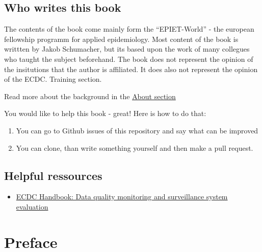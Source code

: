 \documentclass[
  letterpaper,
  DIV=11,
  numbers=noendperiod]{scrreprt}
\providecommand{\tightlist}{%
  \setlength{\itemsep}{0pt}\setlength{\parskip}{0pt}}\usepackage{longtable,booktabs,array}
\begin{document}
\section*{Who writes this book}\label{who-writes-this-book}


The contents of the book come mainly form the ``EPIET-World'' - the
european fellowship programm for applied epidemiology. Most content of
the book is writtten by Jakob Schumacher, but its based upon the work of
many collegues who taught the subject beforehand. The book does not
represent the opinion of the insitutions that the author is affiliated.
It does also not represent the opinion of the ECDC. Training section.

Read more about the background in the \href{about.qmd}{About section}

You would like to help this book - great! Here is how to do that:

\begin{enumerate}
\def\labelenumi{\arabic{enumi}.}
\tightlist
\item
  You can go to Github issues of this repository and say what can be
  improved
\item
  You can clone, than write something yourself and then make a pull
  request.
\end{enumerate}

\section*{Helpful ressources}\label{helpful-ressources}


\begin{itemize}
\tightlist
\item
  \href{https://www.ecdc.europa.eu/en/publications-data/data-quality-monitoring-and-surveillance-system-evaluation-handbook-methods-and}{ECDC
  Handbook: Data quality monitoring and surveillance system evaluation}
\end{itemize}


\chapter*{Preface}\label{preface}
\end{document}
